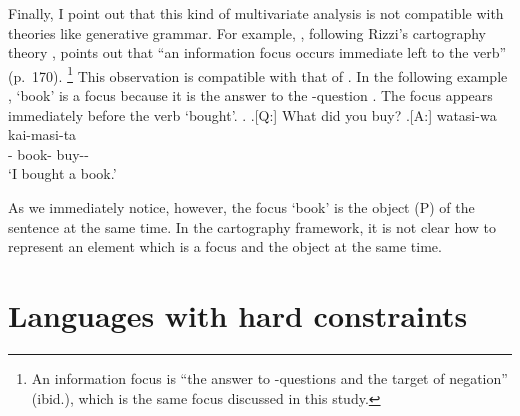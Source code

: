 
Finally, I point out that this kind of multivariate analysis
is not compatible with theories like generative grammar.
For example,
, following Rizzi's cartography theory \cite[e.g.,][]{rizzi97,rizzi04},
points out that ``an information focus occurs immediate left to the verb'' (p.~170).%
 \footnote{
 An information focus is ``the answer to -questions and the target of negation'' (ibid.),
 which is the same focus discussed in this study.
 }
This observation is compatible with that of .
In the following example \Next[A],
 `book' is a focus because it is the answer to the -question \Next[Q].
The focus appears immediately before the verb  `bought'.
%
\ex.
 \a.[Q:] What did you buy?
 \bg.[A:] watasi-wa  kai-masi-ta \\
          - book- buy-- \\
          `I bought a book.'
  \hfill{\cite[170--171]{endo14}}

As we immediately notice, however,
the focus  `book' is the object (P) of the sentence at the same time.
In the cartography framework,
it is not clear how to represent an element which is a focus and the object
at the same time.





\section{Languages with hard constraints}\label{Disc:HardConst}

